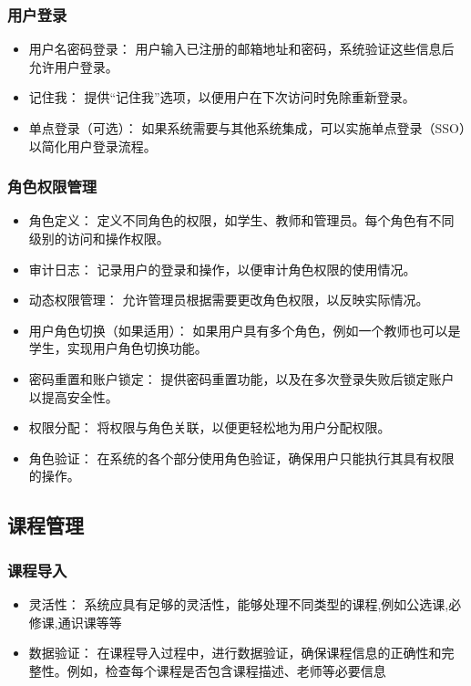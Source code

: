 \documentclass{article}
\begin{document}
\subsubsection{用户登录}
\begin{itemize}
  \item 用户名密码登录： 用户输入已注册的邮箱地址和密码，系统验证这些信息后允许用户登录。
  \item 记住我： 提供“记住我”选项，以便用户在下次访问时免除重新登录。
  \item 单点登录（可选）： 如果系统需要与其他系统集成，可以实施单点登录（SSO）以简化用户登录流程。
\end{itemize}
\subsubsection{角色权限管理}
\begin{itemize}
  \item 角色定义： 定义不同角色的权限，如学生、教师和管理员。每个角色有不同级别的访问和操作权限。
  \item 审计日志： 记录用户的登录和操作，以便审计角色权限的使用情况。
  \item 动态权限管理： 允许管理员根据需要更改角色权限，以反映实际情况。
  \item 用户角色切换（如果适用）： 如果用户具有多个角色，例如一个教师也可以是学生，实现用户角色切换功能。
  \item 密码重置和账户锁定： 提供密码重置功能，以及在多次登录失败后锁定账户以提高安全性。
  \item 权限分配： 将权限与角色关联，以便更轻松地为用户分配权限。
  \item 角色验证： 在系统的各个部分使用角色验证，确保用户只能执行其具有权限的操作。
\end{itemize}
\subsection{课程管理}
\subsubsection{课程导入}
\begin{itemize}
  \item 灵活性： 系统应具有足够的灵活性，能够处理不同类型的课程,例如公选课,必修课,通识课等等
  \item 数据验证： 在课程导入过程中，进行数据验证，确保课程信息的正确性和完整性。例如，检查每个课程是否包含课程描述、老师等必要信息
\end{itemize}
\end{document}
